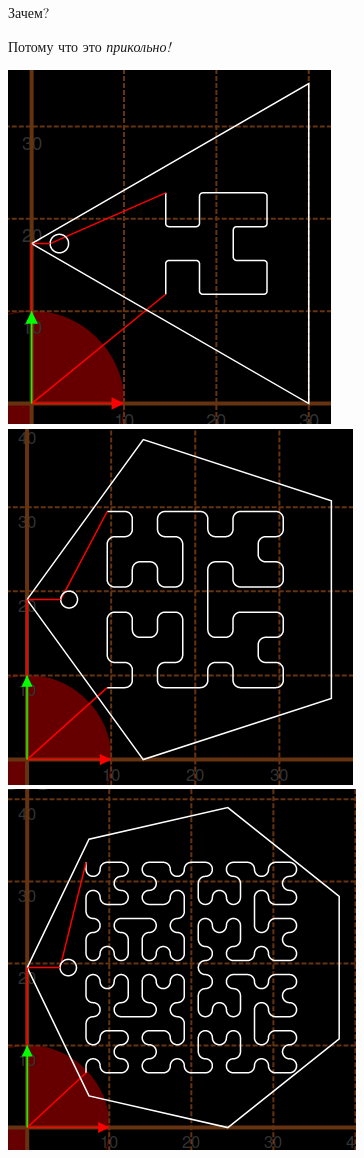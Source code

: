 \documentclass[11pt]{beamer}
\begin{document}
\begin{frame}{Зачем?}
\begin{LARGE}Потому что это \textit{прикольно!}\end{LARGE}

\includegraphics[scale=0.25]{trigon}
\includegraphics[scale=0.25]{5gon}
\includegraphics[scale=0.25]{7gon}


\end{frame}
\end{document}
